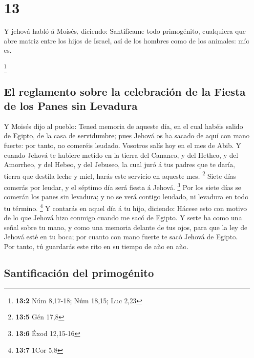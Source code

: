 \hypertarget{section-12}{%
\section{13}\label{section-12}}

 Y jehová habló á Moisés, diciendo:  Santifícame
todo primogénito, cualquiera que abre matriz entre los hijos de Israel,
así de los hombres como de los animales: mío es.

\footnote{\textbf{13:2} Núm 8,17-18; Núm 18,15; Luc 2,23}

\hypertarget{el-reglamento-sobre-la-celebraciuxf3n-de-la-fiesta-de-los-panes-sin-levadura}{%
\subsection{El reglamento sobre la celebración de la Fiesta de los Panes
sin
Levadura}\label{el-reglamento-sobre-la-celebraciuxf3n-de-la-fiesta-de-los-panes-sin-levadura}}

 Y Moisés dijo al pueblo: Tened memoria de aqueste día, en
el cual habéis salido de Egipto, de la casa de servidumbre; pues Jehová
os ha sacado de aquí con mano fuerte: por tanto, no comeréis leudado.
 Vosotros salís hoy en el mes de Abib.  Y cuando
Jehová te hubiere metido en la tierra del Cananeo, y del Hetheo, y del
Amorrheo, y del Hebeo, y del Jebuseo, la cual juró á tus padres que te
daría, tierra que destila leche y miel, harás este servicio en aqueste
mes. \footnote{\textbf{13:5} Gén 17,8}  Siete días comerás
por leudar, y el séptimo día será fiesta á Jehová. \footnote{\textbf{13:6}
  Éxod 12,15-16}  Por los siete días se comerán los panes
sin levadura; y no se verá contigo leudado, ni levadura en todo tu
término. \footnote{\textbf{13:7} 1Cor 5,8}  Y contarás en
aquel día á tu hijo, diciendo: Hácese esto con motivo de lo que Jehová
hizo conmigo cuando me sacó de Egipto.  Y serte ha como una
señal sobre tu mano, y como una memoria delante de tus ojos, para que la
ley de Jehová esté en tu boca; por cuanto con mano fuerte te sacó Jehová
de Egipto.  Por tanto, tú guardarás este rito en su tiempo
de año en año.

\hypertarget{santificaciuxf3n-del-primoguxe9nito}{%
\subsection{Santificación del
primogénito}\label{santificaciuxf3n-del-primoguxe9nito}}

